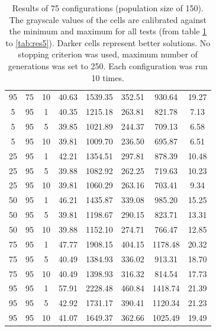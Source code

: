 \begin{table}[H]
\begin{tabular}{ccc|c|c|c|c|c}
95 & 75 & 10 & \cellcolor{gray!72}40.63 & \cellcolor{gray!1}1539.35 & \cellcolor{gray!1}352.51 & \cellcolor{gray!1}930.64 & 19.27\\
5 & 95 & 1 & \cellcolor{gray!75}40.35 & \cellcolor{gray!1}1215.18 & \cellcolor{gray!1}263.81 & \cellcolor{gray!31}821.78 & 7.13\\
5 & 95 & 5 & \cellcolor{gray!80}39.85 & \cellcolor{gray!31}1021.89 & \cellcolor{gray!17}244.37 & \cellcolor{gray!65}709.13 & 6.58\\
5 & 95 & 10 & \cellcolor{gray!80}39.81 & \cellcolor{gray!33}1009.70 & \cellcolor{gray!25}236.50 & \cellcolor{gray!69}695.87 & 6.51\\
25 & 95 & 1 & \cellcolor{gray!56}42.21 & \cellcolor{gray!1}1354.51 & \cellcolor{gray!1}297.81 & \cellcolor{gray!13}878.39 & 10.48\\
25 & 95 & 5 & \cellcolor{gray!80}39.88 & \cellcolor{gray!21}1082.92 & \cellcolor{gray!1}262.25 & \cellcolor{gray!62}719.63 & 10.23\\
25 & 95 & 10 & \cellcolor{gray!80}39.81 & \cellcolor{gray!25}1060.29 & \cellcolor{gray!1}263.16 & \cellcolor{gray!67}703.41 & 9.34\\
50 & 95 & 1 & \cellcolor{gray!16}46.21 & \cellcolor{gray!1}1435.87 & \cellcolor{gray!1}339.08 & \cellcolor{gray!1}985.20 & 15.25\\
50 & 95 & 5 & \cellcolor{gray!80}39.81 & \cellcolor{gray!2}1198.67 & \cellcolor{gray!1}290.15 & \cellcolor{gray!30}823.71 & 13.31\\
50 & 95 & 10 & \cellcolor{gray!80}39.88 & \cellcolor{gray!9}1152.10 & \cellcolor{gray!1}274.71 & \cellcolor{gray!48}766.47 & 12.85\\
75 & 95 & 1 & \cellcolor{gray!1}47.77 & \cellcolor{gray!1}1908.15 & \cellcolor{gray!1}404.15 & \cellcolor{gray!1}1178.48 & 20.32\\
75 & 95 & 5 & \cellcolor{gray!74}40.49 & \cellcolor{gray!1}1384.93 & \cellcolor{gray!1}336.02 & \cellcolor{gray!3}913.31 & 18.70\\
75 & 95 & 10 & \cellcolor{gray!74}40.49 & \cellcolor{gray!1}1398.93 & \cellcolor{gray!1}316.32 & \cellcolor{gray!33}814.54 & 17.73\\
95 & 95 & 1 & \cellcolor{gray!1}57.91 & \cellcolor{gray!1}2228.48 & \cellcolor{gray!1}460.84 & \cellcolor{gray!1}1418.74 & 21.39\\
95 & 95 & 5 & \cellcolor{gray!49}42.92 & \cellcolor{gray!1}1731.17 & \cellcolor{gray!1}390.41 & \cellcolor{gray!1}1120.34 & 21.23\\
95 & 95 & 10 & \cellcolor{gray!68}41.07 & \cellcolor{gray!1}1649.37 & \cellcolor{gray!1}362.66 & \cellcolor{gray!1}1025.49 & 19.49
\end{tabular}
\caption{Results of 75 configurations (population size of 150). The grayscale values of the cells are calibrated against the minimum and maximum for all tests (from table \ref{tab:res1} to \ref{tab:res5}). Darker cells represent better solutions. No stopping criterion was used, maximum number of generations was set to 250. Each configuration was run 10 times.}
\label{tab:res1}
\end{table}

